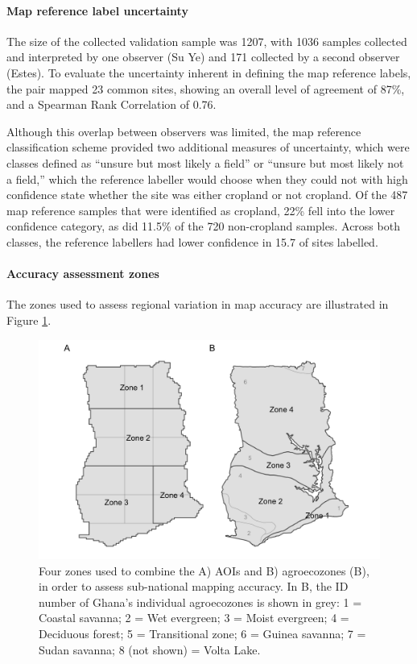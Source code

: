 \documentclass[
  11pt,
  a4paper]{article}
\begin{document}
\hypertarget{map-reference-label-uncertainty}{%
\paragraph{Map reference label
uncertainty}\label{map-reference-label-uncertainty}}

The size of the collected validation sample was 1207, with 1036 samples
collected and interpreted by one observer (Su Ye) and 171 collected by a
second observer (Estes). To evaluate the uncertainty inherent in
defining the map reference labels, the pair mapped 23 common sites,
showing an overall level of agreement of 87\%, and a Spearman Rank
Correlation of 0.76.

Although this overlap between observers was limited, the map reference
classification scheme provided two additional measures of uncertainty,
which were classes defined as ``unsure but most likely a field'' or
``unsure but most likely not a field,'' which the reference labeller
would choose when they could not with high confidence state whether the
site was either cropland or not cropland. Of the 487 map reference
samples that were identified as cropland, 22\% fell into the lower
confidence category, as did 11.5\% of the 720 non-cropland samples.
Across both classes, the reference labellers had lower confidence in
15.7 of sites labelled.

\hypertarget{accuracy-assessment-zones}{%
\paragraph{Accuracy assessment zones}\label{accuracy-assessment-zones}}

The zones used to assess regional variation in map accuracy are
illustrated in Figure \ref{fig:aoizones}.

\begin{figure}[!ht]

{\centering \includegraphics[width=0.9\linewidth,]{figures/si_aoi_zones} 

}

\caption{Four zones used to combine the A) AOIs and B) agroecozones (B), in order to assess sub-national mapping accuracy. In B, the ID number of Ghana's individual agroecozones is shown in grey: 1 = Coastal savanna; 2 = Wet evergreen; 3 = Moist evergreen; 4 = Deciduous forest; 5 = Transitional zone; 6 = Guinea savanna; 7 = Sudan savanna; 8 (not shown) = Volta Lake.}\label{fig:aoizones}
\end{figure}
\end{document}

